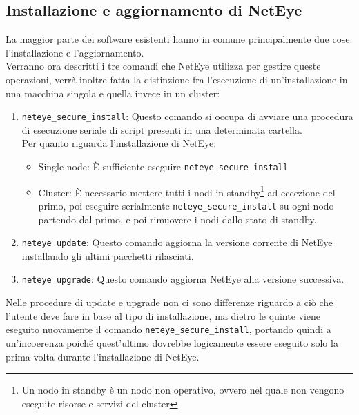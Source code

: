 \subsection{Installazione e aggiornamento di NetEye}
\label{sub:install_update} La maggior parte dei software esistenti hanno in comune
principalmente due cose: l'installazione e l'aggiornamento.\\ Verranno ora
descritti i tre comandi che NetEye utilizza per gestire queste operazioni, verrà
inoltre fatta la distinzione fra l'esecuzione di un'installazione in una macchina
singola e quella invece in un cluster:
\begin{enumerate}
  \item \texttt{neteye\_secure\_install}: Questo comando si occupa di avviare una
    procedura di esecuzione seriale di script presenti in una determinata cartella.\\
    Per quanto riguarda l'installazione di NetEye:
    \begin{itemize}
      \item Single node: È sufficiente eseguire \texttt{neteye\_secure\_install}

      \item Cluster: È necessario mettere tutti i nodi in standby\footnote{Un
        nodo in standby è un nodo non operativo, ovvero nel quale non vengono eseguite
        risorse e servizi del cluster} ad eccezione del primo, poi eseguire
        serialmente \texttt{neteye\_secure\_install} su ogni nodo partendo dal primo,
        e poi rimuovere i nodi dallo stato di standby.
    \end{itemize}

  \item \texttt{neteye update}: Questo comando aggiorna la versione corrente di NetEye
    installando gli ultimi pacchetti rilasciati.\\

  \item \texttt{neteye upgrade}: Questo comando aggiorna NetEye alla versione successiva.
\end{enumerate}
Nelle procedure di update e upgrade non ci sono differenze riguardo a ciò che l'utente
deve fare in base al tipo di installazione, ma dietro le quinte viene eseguito nuovamente
il comando \texttt{neteye\_secure\_install}, portando quindi a un'incoerenza poiché
quest'ultimo dovrebbe logicamente essere eseguito solo la prima volta durante l'installazione
di NetEye.


